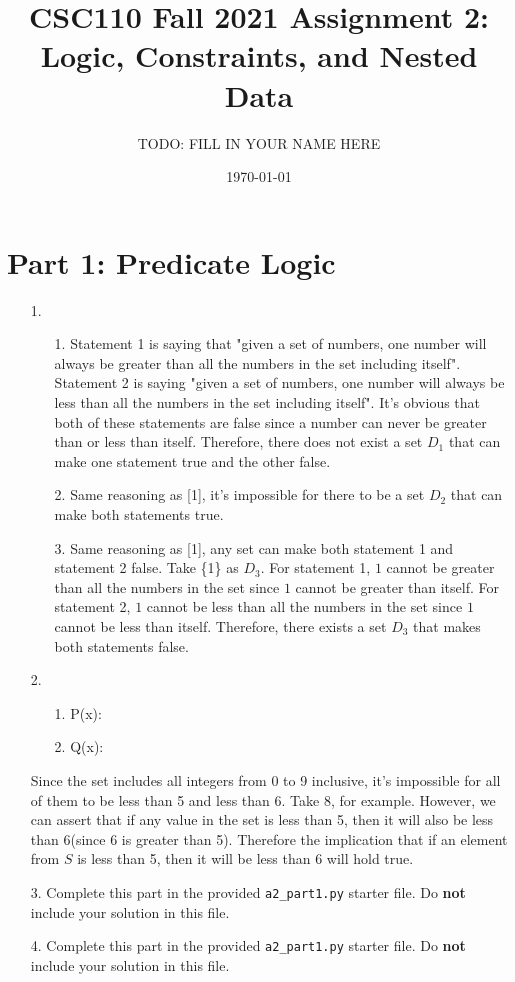 \documentclass[fontsize=11pt]{article}
\title{CSC110 Fall 2021 Assignment 2: Logic, Constraints, and Nested Data}
\author{TODO: FILL IN YOUR NAME HERE}
\date{\today}
\begin{document}
\maketitle

\section*{Part 1: Predicate Logic}

\begin{enumerate}

\item[1.]
    \begin{enumerate}
        \item[1.] Statement 1 is saying that "given a set of numbers, one number will always be greater than all the numbers in the set including itself". Statement 2 is saying "given a set of numbers, one number will always be less than all the numbers in the set including itself". It's obvious that both of these statements are false since a number can never be greater than or less than itself. Therefore, there does not exist a set $D_{1}$ that can make one statement true and the other false.
        \item[2.] Same reasoning as [1], it's impossible for there to be a set $D_{2}$ that can make both statements true.
        \item[3.] Same reasoning as [1], any set can make both statement 1 and statement 2 false. Take \{1\} as $D_{3}$. For statement 1, $1$ cannot be greater than all the numbers in the set since $1$ cannot be greater than itself.  For statement 2, $1$ cannot be less than all the numbers in the set since $1$ cannot be less than itself. Therefore, there exists a set $D_{3}$ that makes both statements false.
    \end{enumerate}

\item[2.]
    \begin{enumerate}
        \item[1.] P(x): 
        \item[2.] Q(x): 
    \end{enumerate}
   Since the set includes all integers from 0 to 9 inclusive, it's impossible for all of them to be less than 5 and less than 6. Take 8, for example. However, we can assert that if any value in the set is less than 5, then it will also be less than 6(since 6 is greater than 5). Therefore the implication that if an element from $S$ is less than 5, then it will be less than 6 will hold true.

\item[3.]
Complete this part in the provided \texttt{a2\_part1.py} starter file.
Do \textbf{not} include your solution in this file.

\item[4.]
Complete this part in the provided \texttt{a2\_part1.py} starter file.
Do \textbf{not} include your solution in this file.

\end{enumerate}
\end{document}
